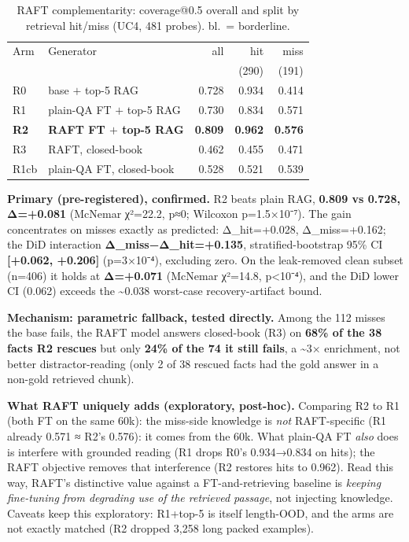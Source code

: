 \documentclass[10pt,twocolumn]{article}
\begin{document}
\begin{table}[!htbp]
\centering
\caption{RAFT complementarity: coverage@0.5 overall and split by retrieval hit/miss (UC4, 481 probes). bl.\ = borderline.}
\label{tab:raft}
\small
\begin{tabularx}{\columnwidth}{@{}l L r r r@{}}
\toprule
Arm & Generator & all & hit & miss \\
    &           &     & \scriptsize(290) & \scriptsize(191) \\
\midrule
R0 & base $+$ top-5 RAG & 0.728 & 0.934 & 0.414 \\
R1 & plain-QA FT $+$ top-5 RAG & 0.730 & 0.834 & 0.571 \\
\textbf{R2} & \textbf{RAFT FT $+$ top-5 RAG} & \textbf{0.809} & \textbf{0.962} & \textbf{0.576} \\
R3 & RAFT, closed-book & 0.462 & 0.455 & 0.471 \\
R1cb & plain-QA FT, closed-book & 0.528 & 0.521 & 0.539 \\
\bottomrule
\end{tabularx}
\end{table}

\textbf{Primary (pre-registered), confirmed.} R2 beats plain RAG, \textbf{0.809 vs 0.728, Δ=+0.081} (McNemar χ²=22.2, p≈0; Wilcoxon p=1.5×10⁻⁷). The gain concentrates on misses exactly as predicted: Δ\_hit=+0.028, Δ\_miss=+0.162; the DiD interaction \textbf{Δ\_miss−Δ\_hit=+0.135}, stratified-bootstrap 95\% CI \textbf{{[}+0.062, +0.206{]}} (p=3×10⁻⁴), excluding zero. On the leak-removed clean subset (n=406) it holds at \textbf{Δ=+0.071} (McNemar χ²=14.8, p\textless10⁻⁴), and the DiD lower CI (0.062) exceeds the \textasciitilde0.038 worst-case recovery-artifact bound.

\textbf{Mechanism: parametric fallback, tested directly.} Among the 112 misses the base fails, the RAFT model answers closed-book (R3) on \textbf{68\% of the 38 facts R2 rescues} but only \textbf{24\% of the 74 it still fails}, a \textasciitilde3× enrichment, not better distractor-reading (only 2 of 38 rescued facts had the gold answer in a non-gold retrieved chunk).

\textbf{What RAFT uniquely adds (exploratory, post-hoc).} Comparing R2 to R1 (both FT on the same 60k): the miss-side knowledge is \emph{not} RAFT-specific (R1 already 0.571 ≈ R2's 0.576): it comes from the 60k. What plain-QA FT \emph{also} does is interfere with grounded reading (R1 drops R0's 0.934→0.834 on hits); the RAFT objective removes that interference (R2 restores hits to 0.962). Read this way, RAFT's distinctive value against a FT-and-retrieving baseline is \emph{keeping fine-tuning from degrading use of the retrieved passage}, not injecting knowledge. Caveats keep this exploratory: R1+top-5 is itself length-OOD, and the arms are not exactly matched (R2 dropped 3,258 long packed examples).
\end{document}
